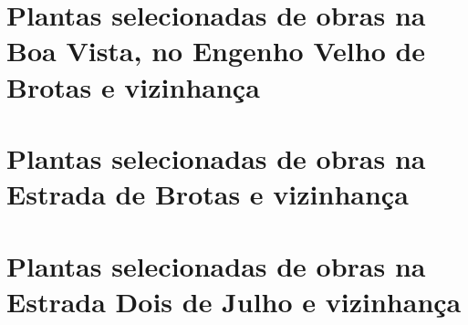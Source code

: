 \begin{anexosenv}
\chapter{Plantas selecionadas de obras na Boa Vista, no Engenho Velho de Brotas e vizinhança}


\chapter{Plantas selecionadas de obras na Estrada de Brotas e vizinhança}


\chapter{Plantas selecionadas de obras na Estrada Dois de Julho e vizinhança}



\end{anexosenv}
